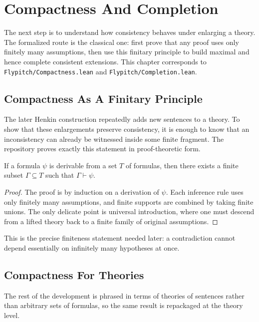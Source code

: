 \chapter{Compactness And Completion}
\label{chap:compactness-completion}

The next step is to understand how consistency behaves under enlarging a
theory. The formalized route is the classical one: first prove that any proof
uses only finitely many assumptions, then use this finitary principle to build
maximal and hence complete consistent extensions. This chapter corresponds to
\texttt{Flypitch/Compactness.lean} and \texttt{Flypitch/Completion.lean}.

\section{Compactness As A Finitary Principle}

The later Henkin construction repeatedly adds new sentences to a theory. To
show that these enlargements preserve consistency, it is enough to know that an
inconsistency can already be witnessed inside some finite fragment. The
repository proves exactly this statement in proof-theoretic form.

\begin{theorem}
\label{thm:proof-compactness}
If a formula $\psi$ is derivable from a set $T$ of formulas, then there exists
a finite subset $\Gamma \subseteq T$ such that $\Gamma \vdash \psi$.
\end{theorem}

\begin{proof}
The proof is by induction on a derivation of $\psi$. Each inference rule uses
only finitely many assumptions, and finite supports are combined by taking
finite unions. The only delicate point is universal introduction, where one
must descend from a lifted theory back to a finite family of original
assumptions.
\end{proof}

This is the precise finiteness statement needed later: a contradiction cannot
depend essentially on infinitely many hypotheses at once.

\section{Compactness For Theories}

The rest of the development is phrased in terms of theories of sentences rather
than arbitrary sets of formulas, so the same result is repackaged at the
theory level.

